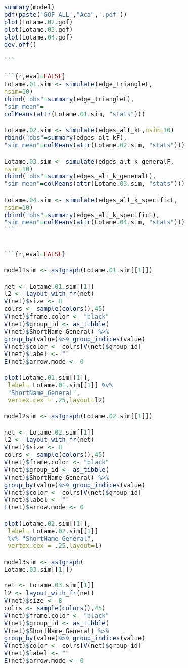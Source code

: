 \begin{lstlisting}[language=R]
summary(model)
pdf(paste('GOF ALL',"Aca",'.pdf'))
plot(Lotame.02.gof)
plot(Lotame.03.gof)
plot(Lotame.04.gof)
dev.off()

```

```{r,eval=FALSE}
Lotame.01.sim <- simulate(edge_triangleF,
nsim=10)
rbind("obs"=summary(edge_triangleF),
"sim mean"=
colMeans(attr(Lotame.01.sim, "stats")))

Lotame.02.sim <- simulate(edges_alt_kF,nsim=10)
rbind("obs"=summary(edges_alt_kF),
"sim mean"=colMeans(attr(Lotame.02.sim, "stats")))

Lotame.03.sim <- simulate(edges_alt_k_generalF,
nsim=10)
rbind("obs"=summary(edges_alt_k_generalF),
"sim mean"=colMeans(attr(Lotame.03.sim, "stats")))

Lotame.04.sim <- simulate(edges_alt_k_specificF,
nsim=10)
rbind("obs"=summary(edges_alt_k_specificF),
"sim mean"=colMeans(attr(Lotame.04.sim, "stats")))
```


```{r,eval=FALSE}

model1sim <- asIgraph(Lotame.01.sim[[1]])

net <- Lotame.01.sim[[1]]
l2 <- layout_with_fr(net)
V(net)$size <- 8
colrs <- sample(colors(),45)
V(net)$frame.color <- "black"
V(net)$group_id <- as_tibble(
V(net)$ShortName_General) %>% 
group_by(value)%>% group_indices(value) 
V(net)$color <- colrs[V(net)$group_id]
V(net)$label <- "" 
E(net)$arrow.mode <- 0

plot(Lotame.01.sim[[1]], 
 label= Lotame.01.sim[[1]] %v%
 "ShortName_General",
 vertex.cex = .25,layout=l2)

model2sim <- asIgraph(Lotame.02.sim[[1]])

net <- Lotame.02.sim[[1]]
l2 <- layout_with_fr(net)
V(net)$size <- 8
colrs <- sample(colors(),45)
V(net)$frame.color <- "black"
V(net)$group_id <- as_tibble(
V(net)$ShortName_General) %>% 
group_by(value)%>% group_indices(value) 
V(net)$color <- colrs[V(net)$group_id]
V(net)$label <- "" 
E(net)$arrow.mode <- 0

plot(Lotame.02.sim[[1]], 
 label= Lotame.02.sim[[1]]
 %v% "ShortName_General",
 vertex.cex = .25,layout=l)

model3sim <- asIgraph(
Lotame.03.sim[[1]])

net <- Lotame.03.sim[[1]]
l2 <- layout_with_fr(net)
V(net)$size <- 8
colrs <- sample(colors(),45)
V(net)$frame.color <- "black"
V(net)$group_id <- as_tibble(
V(net)$ShortName_General) %>%
group_by(value)%>% group_indices(value) 
V(net)$color <- colrs[V(net)$group_id]
V(net)$label <- "" 
E(net)$arrow.mode <- 0


\end{lstlisting}
